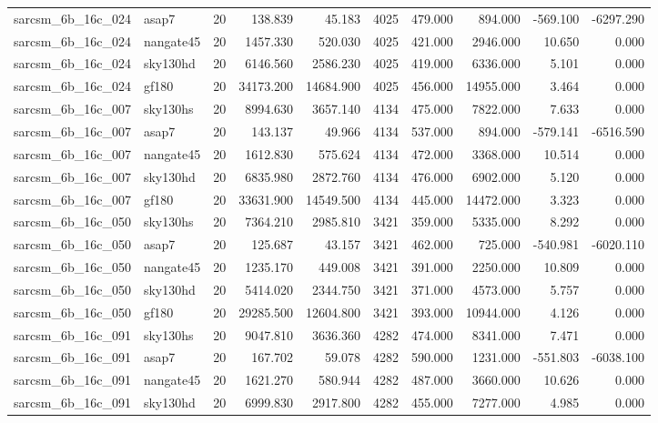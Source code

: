 \begin{longtable}{llrrrrrrrr}
sarcsm\_6b\_16c\_024 & asap7 & 20 & 138.839 & 45.183 & 4025 & 479.000 & 894.000 & -569.100 & -6297.290 \\
sarcsm\_6b\_16c\_024 & nangate45 & 20 & 1457.330 & 520.030 & 4025 & 421.000 & 2946.000 & 10.650 & 0.000 \\
sarcsm\_6b\_16c\_024 & sky130hd & 20 & 6146.560 & 2586.230 & 4025 & 419.000 & 6336.000 & 5.101 & 0.000 \\
sarcsm\_6b\_16c\_024 & gf180 & 20 & 34173.200 & 14684.900 & 4025 & 456.000 & 14955.000 & 3.464 & 0.000 \\
sarcsm\_6b\_16c\_007 & sky130hs & 20 & 8994.630 & 3657.140 & 4134 & 475.000 & 7822.000 & 7.633 & 0.000 \\
sarcsm\_6b\_16c\_007 & asap7 & 20 & 143.137 & 49.966 & 4134 & 537.000 & 894.000 & -579.141 & -6516.590 \\
sarcsm\_6b\_16c\_007 & nangate45 & 20 & 1612.830 & 575.624 & 4134 & 472.000 & 3368.000 & 10.514 & 0.000 \\
sarcsm\_6b\_16c\_007 & sky130hd & 20 & 6835.980 & 2872.760 & 4134 & 476.000 & 6902.000 & 5.120 & 0.000 \\
sarcsm\_6b\_16c\_007 & gf180 & 20 & 33631.900 & 14549.500 & 4134 & 445.000 & 14472.000 & 3.323 & 0.000 \\
sarcsm\_6b\_16c\_050 & sky130hs & 20 & 7364.210 & 2985.810 & 3421 & 359.000 & 5335.000 & 8.292 & 0.000 \\
sarcsm\_6b\_16c\_050 & asap7 & 20 & 125.687 & 43.157 & 3421 & 462.000 & 725.000 & -540.981 & -6020.110 \\
sarcsm\_6b\_16c\_050 & nangate45 & 20 & 1235.170 & 449.008 & 3421 & 391.000 & 2250.000 & 10.809 & 0.000 \\
sarcsm\_6b\_16c\_050 & sky130hd & 20 & 5414.020 & 2344.750 & 3421 & 371.000 & 4573.000 & 5.757 & 0.000 \\
sarcsm\_6b\_16c\_050 & gf180 & 20 & 29285.500 & 12604.800 & 3421 & 393.000 & 10944.000 & 4.126 & 0.000 \\
sarcsm\_6b\_16c\_091 & sky130hs & 20 & 9047.810 & 3636.360 & 4282 & 474.000 & 8341.000 & 7.471 & 0.000 \\
sarcsm\_6b\_16c\_091 & asap7 & 20 & 167.702 & 59.078 & 4282 & 590.000 & 1231.000 & -551.803 & -6038.100 \\
sarcsm\_6b\_16c\_091 & nangate45 & 20 & 1621.270 & 580.944 & 4282 & 487.000 & 3660.000 & 10.626 & 0.000 \\
sarcsm\_6b\_16c\_091 & sky130hd & 20 & 6999.830 & 2917.800 & 4282 & 455.000 & 7277.000 & 4.985 & 0.000 \\

\end{longtable}
